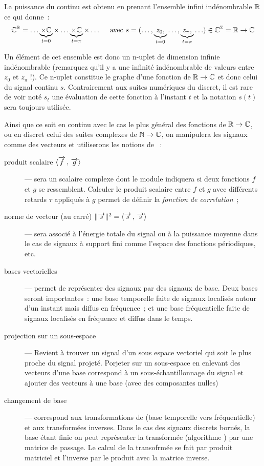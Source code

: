 \begin{remarque}
  
  La puissance du continu est obtenu en prenant l'ensemble infini
  indénombrable $\mathbb{R}$ ce qui donne~:
  $$ \mathbb{C}^{\mathbb{R}} = \ldots \underbrace{\times\mathbb{C}}_{t=0} \times \ldots \underbrace{\times\mathbb{C}}_{t=\pi} \times \ldots \quad\text{ avec } s=(\ldots, \underbrace{z_0, }_{t=0} \ldots, \underbrace{z_\pi, }_{t=\pi} \ldots) \in  \mathbb{C}^{\mathbb{Z}}=\mathbb{R}\to\mathbb{C}$$

  Un élément de cet ensemble est donc un n-uplet de dimension infinie
  indénombrable (remarquez qu'il y a une infinité indénombrable de
  valeurs entre $z_0$ et $ z_\pi$ !). Ce n-uplet constitue le graphe
  d'une fonction de $\mathbb{R}\to\mathbb{C}$ et donc celui du signal continu
  $s$. Contrairement aux suites numériques du discret, il est rare de
  voir noté $s_t$ une évaluation de cette fonction à l'instant $t$ et
  la notation $s(t)$ sera toujours utilisée.
\end{remarque}


Ainsi que ce soit en continu avec le cas le plus général des fonctions
de $\mathbb{R}\to\mathbb{C}$, ou en discret celui des suites complexes de $\mathbb{N}\to\mathbb{C}$,
on manipulera les signaux comme des vecteurs et utiliserons les
notions de ~:
\begin{description}
\item[produit scalaire $\langle\overrightarrow{f}\,,\,\overrightarrow{g}\rangle$]--- sera un scalaire
  complexe dont le module indiquera si deux fonctions $f$ et $g$ se
  ressemblent. Calculer le produit scalaire entre $f$ et $g$ avec
  différents retards $\tau$ appliqués à $g$ permet de définir la
  \emph{fonction de correlation}~;
\item[norme de vecteur (au carré)
  $\|\overrightarrow{s}\|^2=\langle\overrightarrow{s}\,,\,\overrightarrow{s}\rangle$]--- sera associé à l'énergie
  totale du signal ou à la puissance moyenne dans le cas de signaux à
  support fini comme l'espace des fonctions périodiques, etc.
\item[bases vectorielles]--- permet de représenter des signaux par des
  signaux de base. Deux bases seront importantes~: une base temporelle
  faite de signaux localisés autour d'un instant mais diffus en
  fréquence~; et une base fréquentielle faite de signaux localisés en
  fréquence et diffus dans le temps.
\item[projection sur un sous-espace]--- Revient à trouver un signal
  d'un sous espace vectoriel qui soit le plus proche du signal projeté.
   Porjeter sur
  un sous-espace en enlevant des vecteurs d'une base correspond à un
  sous-échantillonnage du signal et ajouter des vecteurs à une base
  (avec des composantes nulles)
\item[changement de base]--- correspond aux transformations de
  \Fourier{} (base temporelle vers fréquentielle) et aux transformées
  inverses. Dans le cas des signaux discrets bornés, la base étant
  finie on peut représenter la transformée \TFD{} (algorithme \FFT)
  par une matrice de passage. Le calcul de la transofrmée se fait par
  produit matriciel et l'inverse par le produit avec la matrice
  inverse.
\end{description}
 
